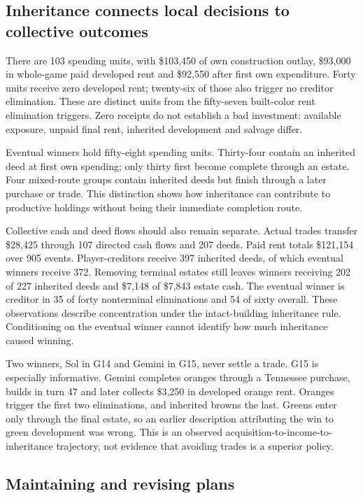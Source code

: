 \subsection{Inheritance connects local decisions to collective outcomes}

There are 103 spending units, with \$103,450 of own construction outlay, \$93,000 in whole-game paid developed rent and \$92,550 after first own expenditure. Forty units receive zero developed rent; twenty-six of those also trigger no creditor elimination. These are distinct units from the fifty-seven built-color rent elimination triggers. Zero receipts do not establish a bad investment: available exposure, unpaid final rent, inherited development and salvage differ.

Eventual winners hold fifty-eight spending units. Thirty-four contain an inherited deed at first own spending; only thirty first become complete through an estate. Four mixed-route groups contain inherited deeds but finish through a later purchase or trade. This distinction shows how inheritance can contribute to productive holdings without being their immediate completion route.

Collective cash and deed flows should also remain separate. Actual trades transfer \$28,425 through 107 directed cash flows and 207 deeds. Paid rent totals \$121,154 over 905 events. Player-creditors receive 397 inherited deeds, of which eventual winners receive 372. Removing terminal estates still leaves winners receiving 202 of 227 inherited deeds and \$7,148 of \$7,843 estate cash. The eventual winner is creditor in 35 of forty nonterminal eliminations and 54 of sixty overall. These observations describe concentration under the intact-building inheritance rule. Conditioning on the eventual winner cannot identify how much inheritance caused winning.

Two winners, Sol in G14 and Gemini in G15, never settle a trade. G15 is especially informative. Gemini completes oranges through a Tennessee purchase, builds in turn 47 and later collects \$3,250 in developed orange rent. Oranges trigger the first two eliminations, and inherited browns the last. Greens enter only through the final estate, so an earlier description attributing the win to green development was wrong. This is an observed acquisition-to-income-to-inheritance trajectory, not evidence that avoiding trades is a superior policy.

\subsection{Maintaining and revising plans}

